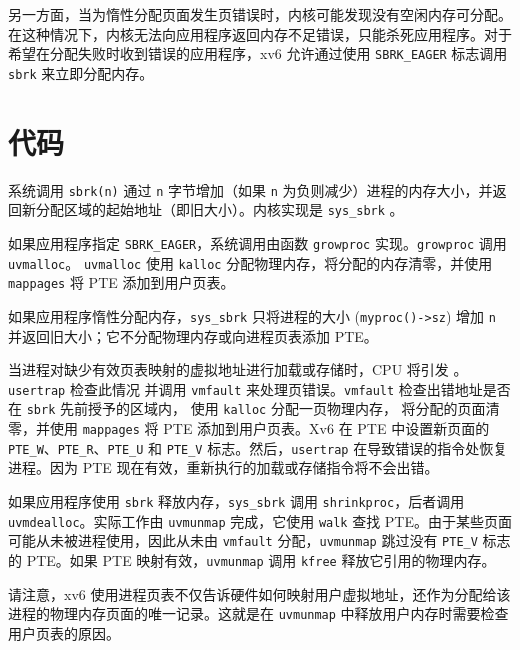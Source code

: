另一方面，当为惰性分配页面发生页错误时，内核可能发现没有空闲内存可分配。在这种情况下，内核无法向应用程序返回内存不足错误，只能杀死应用程序。对于希望在分配失败时收到错误的应用程序，xv6 允许通过使用 \lstinline{SBRK_EAGER} 标志调用 \lstinline{sbrk} 来立即分配内存。

\section{代码}

系统调用 {\tt sbrk(n)} 通过 {\tt n} 字节增加（如果 {\tt n} 为负则减少）进程的内存大小，并返回新分配区域的起始地址（即旧大小）。内核实现是 \lstinline{sys_sbrk}
。

如果应用程序指定 \lstinline{SBRK_EAGER}，系统调用由函数
\lstinline{growproc}
实现。\lstinline{growproc} 调用 \lstinline{uvmalloc}。
\lstinline{uvmalloc}
使用 {\tt kalloc} 分配物理内存，将分配的内存清零，并使用 {\tt mappages} 将 PTE 添加到用户页表。

如果应用程序惰性分配内存，\lstinline{sys_sbrk}
只将进程的大小
(\lstinline{myproc()->sz}) 增加 {\tt n} 并返回旧大小；它不分配物理内存或向进程页表添加 PTE。

当进程对缺少有效页表映射的虚拟地址进行加载或存储时，CPU 将引发 。
\lstinline{usertrap} 检查此情况
并调用 \lstinline{vmfault}
来处理页错误。\lstinline{vmfault}
检查出错地址是否在 {\tt sbrk} 先前授予的区域内，
使用 {\tt kalloc} 分配一页物理内存，
将分配的页面清零，并使用
{\tt mappages} 将 PTE 添加到用户页表。Xv6 在 PTE 中设置新页面的 \lstinline{PTE_W}、\lstinline{PTE_R}、\lstinline{PTE_U} 和 \lstinline{PTE_V} 标志。然后，\lstinline{usertrap} 在导致错误的指令处恢复进程。因为 PTE 现在有效，重新执行的加载或存储指令将不会出错。

如果应用程序使用 {\tt sbrk} 释放内存，\lstinline{sys_sbrk}
调用 \lstinline{shrinkproc}，后者调用 \lstinline{uvmdealloc}。实际工作由 {\tt uvmunmap}  完成，它使用 {\tt walk} 查找 PTE。由于某些页面可能从未被进程使用，因此从未由 {\tt vmfault} 分配，{\tt uvmunmap} 跳过没有 \lstinline{PTE_V} 标志的 PTE。如果 PTE 映射有效，{\tt uvmunmap} 调用 {\tt kfree} 释放它引用的物理内存。

请注意，xv6 使用进程页表不仅告诉硬件如何映射用户虚拟地址，还作为分配给该进程的物理内存页面的唯一记录。这就是在 {\tt uvmunmap} 中释放用户内存时需要检查用户页表的原因。

